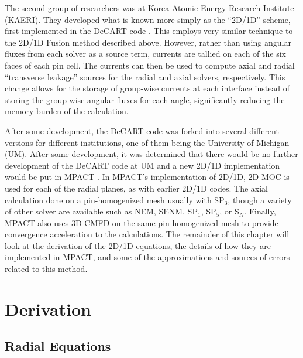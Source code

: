 The second group of researchers was at Korea Atomic Energy Research Institute (KAERI).  They developed what is known more simply as the ``2D/1D'' scheme, first implemented in the DeCART code \cite{3DHetWholeCoreTransPlanarMOC,DeCARTTheoryManual,MethodsAndPerformanceOfDecart}.  This employs very similar technique to the 2D/1D Fusion method described above.  However, rather than using angular fluxes from each solver as a source term, currents are tallied on each of the six faces of each pin cell.  The currents can then be used to compute axial and radial ``transverse leakage'' sources for the radial and axial solvers, respectively.  This change allows for the storage of group-wise currents at each interface instead of storing the group-wise angular fluxes for each angle, significantly reducing the memory burden of the calculation.

After some development, the DeCART code was forked into several different versions for different institutions, one of them being the University of Michigan (UM).  After some development, it was determined that there would be no further development of the DeCART code at UM and a new 2D/1D implementation would be put in MPACT \cite{2D1DApproxTo3DTransport1,StabilityAndAccuracyOf3DTransportInMPACT}.  In MPACT's implementation of 2D/1D, 2D MOC is used for each of the radial planes, as with earlier 2D/1D codes.  The axial calculation done on a pin-homogenized mesh usually with SP$_3$, though a variety of other solver are available such as NEM, SENM, SP$_1$, SP$_5$, or S$_N$.  Finally, MPACT also uses 3D CMFD on the same pin-homogenized mesh to provide convergence acceleration to the calculations.  The remainder of this chapter will look at the derivation of the 2D/1D equations, the details of how they are implemented in MPACT, and some of the approximations and sources of errors related to this method.

\section{Derivation}

\subsection{Radial Equations}\label{ss:2d1dradialEq}


